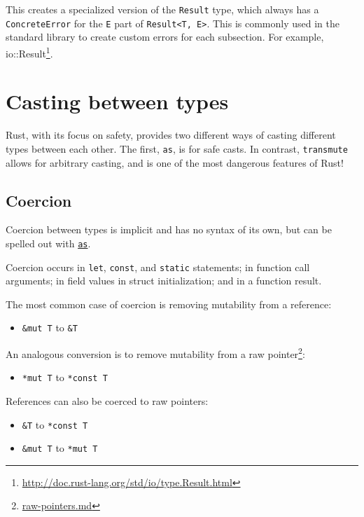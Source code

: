 \documentclass[a4paper,]{book}
\renewcommand{\href}[2]{#2\footnote{\url{#1}}}
\providecommand{\tightlist}{%
  \setlength{\itemsep}{0pt}\setlength{\parskip}{0pt}}
\begin{document}
This creates a specialized version of the \texttt{Result} type, which
always has a \texttt{ConcreteError} for the \texttt{E} part of
\texttt{Result\textless{}T,\ E\textgreater{}}. This is commonly used in
the standard library to create custom errors for each subsection. For
example,
\href{http://doc.rust-lang.org/std/io/type.Result.html}{io::Result}.

\section{Casting between types}\label{sec--casting-between-types}

Rust, with its focus on safety, provides two different ways of casting
different types between each other. The first, \texttt{as}, is for safe
casts. In contrast, \texttt{transmute} allows for arbitrary casting, and
is one of the most dangerous features of Rust!

\subsection{Coercion}\label{coercion}

Coercion between types is implicit and has no syntax of its own, but can
be spelled out with \protect\hyperlink{explicit-coercions}{\texttt{as}}.

Coercion occurs in \texttt{let}, \texttt{const}, and \texttt{static}
statements; in function call arguments; in field values in struct
initialization; and in a function result.

The most common case of coercion is removing mutability from a
reference:

\begin{itemize}
\tightlist
\item
  \texttt{\&mut\ T} to \texttt{\&T}
\end{itemize}

An analogous conversion is to remove mutability from a
\href{raw-pointers.md}{raw pointer}:

\begin{itemize}
\tightlist
\item
  \texttt{*mut\ T} to \texttt{*const\ T}
\end{itemize}

References can also be coerced to raw pointers:

\begin{itemize}
\item
  \texttt{\&T} to \texttt{*const\ T}
\item
  \texttt{\&mut\ T} to \texttt{*mut\ T}
\end{itemize}
\end{document}
